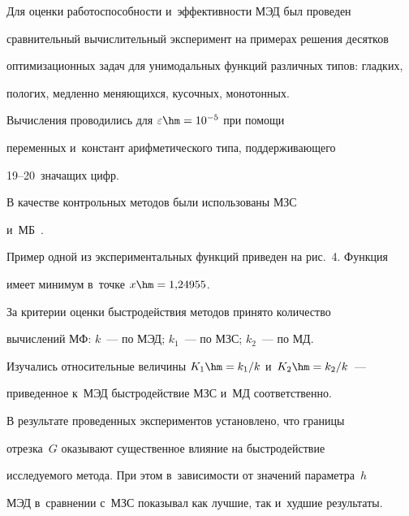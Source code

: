   


  Для оценки работоспособности и~эффективности МЭД был проведен 


сравнительный вычислительный эксперимент на примерах решения десятков 


оптимизационных задач для унимодальных функций различных типов: гладких, 


пологих, медленно меняющихся, кусочных, монотонных. 


  


  Вычисления проводились для $\varepsilon\hm = 10^{-5}$ при помощи 


переменных и~констант арифметического типа, поддерживающего  


19--20~значащих цифр.


  


  В качестве контрольных методов были использованы МЗС  


и~МБ~\cite{3-kod, 4-kod, 5-kod, 6-kod, 7-kod, 8-kod, 9-kod, 10-kod, 11-kod}. 


  


  Пример одной из экспериментальных функций приведен на рис.~4. Функция 


имеет минимум в~точке $x \hm= 1{,}24955$.


  





  За критерии оценки быстродействия методов принято количество 


вычислений МФ: $k$~--- по МЭД; $k_1$~--- по МЗС; $k_2$~--- по МД. 


Изучались относительные величины $K_1\hm = k_1/k$ и~$K_2\hm = k_2/k$~--- 


приведенное к~МЭД быстродействие МЗС и~МД соответственно.








  


  В результате проведенных экспериментов установлено, что границы 


отрезка~$G$ оказывают существенное влияние на быстродействие 


исследуемого метода. При этом в~зависимости от значений параметра~$h$ 


МЭД в~сравнении с~МЗС показывал как лучшие, так и~худшие результаты. 


